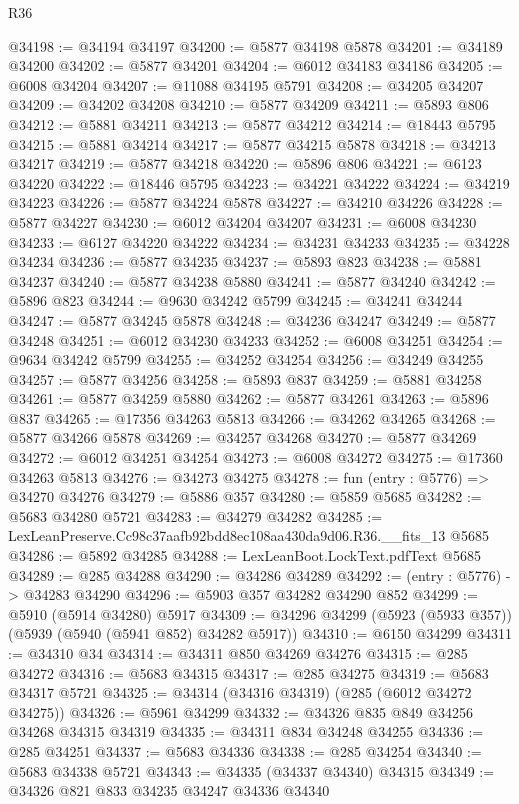 \begin{lexlean}{R36}
\begin{coremodule}
@34198 := @34194 @34197
@34200 := @5877 @34198 @5878
@34201 := @34189 @34200
@34202 := @5877 @34201
@34204 := @6012 @34183 @34186
@34205 := @6008 @34204
@34207 := @11088 @34195 @5791
@34208 := @34205 @34207
@34209 := @34202 @34208
@34210 := @5877 @34209
@34211 := @5893 @806
@34212 := @5881 @34211
@34213 := @5877 @34212
@34214 := @18443 @5795
@34215 := @5881 @34214
@34217 := @5877 @34215 @5878
@34218 := @34213 @34217
@34219 := @5877 @34218
@34220 := @5896 @806
@34221 := @6123 @34220
@34222 := @18446 @5795
@34223 := @34221 @34222
@34224 := @34219 @34223
@34226 := @5877 @34224 @5878
@34227 := @34210 @34226
@34228 := @5877 @34227
@34230 := @6012 @34204 @34207
@34231 := @6008 @34230
@34233 := @6127 @34220 @34222
@34234 := @34231 @34233
@34235 := @34228 @34234
@34236 := @5877 @34235
@34237 := @5893 @823
@34238 := @5881 @34237
@34240 := @5877 @34238 @5880
@34241 := @5877 @34240
@34242 := @5896 @823
@34244 := @9630 @34242 @5799
@34245 := @34241 @34244
@34247 := @5877 @34245 @5878
@34248 := @34236 @34247
@34249 := @5877 @34248
@34251 := @6012 @34230 @34233
@34252 := @6008 @34251
@34254 := @9634 @34242 @5799
@34255 := @34252 @34254
@34256 := @34249 @34255
@34257 := @5877 @34256
@34258 := @5893 @837
@34259 := @5881 @34258
@34261 := @5877 @34259 @5880
@34262 := @5877 @34261
@34263 := @5896 @837
@34265 := @17356 @34263 @5813
@34266 := @34262 @34265
@34268 := @5877 @34266 @5878
@34269 := @34257 @34268
@34270 := @5877 @34269
@34272 := @6012 @34251 @34254
@34273 := @6008 @34272
@34275 := @17360 @34263 @5813
@34276 := @34273 @34275
@34278 := fun (entry : @5776) => @34270 @34276
@34279 := @5886 @357
@34280 := @5859 @5685
@34282 := @5683 @34280 @5721
@34283 := @34279 @34282
@34285 := LexLeanPreserve.Cc98c37aafb92bdd8ec108aa430da9d06.R36.__fits_13 @5685
@34286 := @5892 @34285
@34288 := LexLeanBoot.LockText.pdfText @5685
@34289 := @285 @34288
@34290 := @34286 @34289
@34292 := (entry : @5776) -> @34283 @34290
@34296 := @5903 @357 @34282 @34290 @852
@34299 := @5910 (@5914 @34280) @5917
@34309 := @34296 @34299 (@5923 (@5933 @357)) (@5939 (@5940 (@5941 @852) @34282 @5917))
@34310 := @6150 @34299
@34311 := @34310 @34
@34314 := @34311 @850 @34269 @34276
@34315 := @285 @34272
@34316 := @5683 @34315
@34317 := @285 @34275
@34319 := @5683 @34317 @5721
@34325 := @34314 (@34316 @34319) (@285 (@6012 @34272 @34275))
@34326 := @5961 @34299
@34332 := @34326 @835 @849 @34256 @34268 @34315 @34319
@34335 := @34311 @834 @34248 @34255
@34336 := @285 @34251
@34337 := @5683 @34336
@34338 := @285 @34254
@34340 := @5683 @34338 @5721
@34343 := @34335 (@34337 @34340) @34315
@34349 := @34326 @821 @833 @34235 @34247 @34336 @34340

\end{coremodule}
\end{lexlean}
